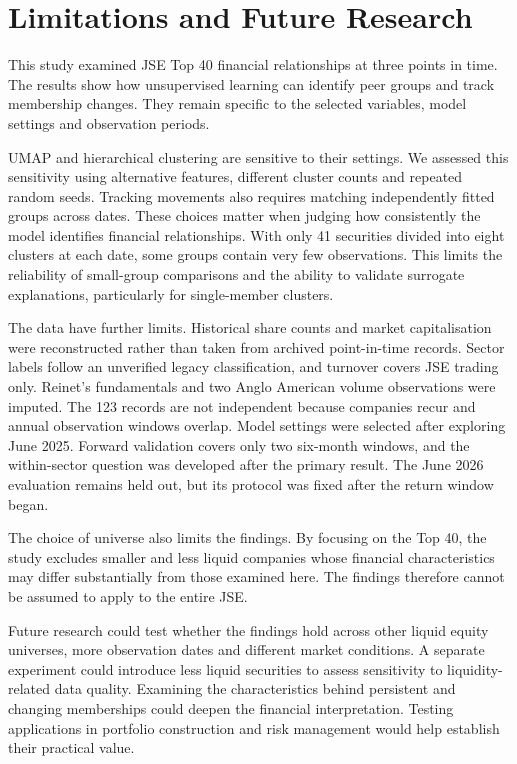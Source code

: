 \section{Limitations and Future Research}

This study examined JSE Top 40 financial relationships at three points in time. The results show how unsupervised learning can identify peer groups and track membership changes. They remain specific to the selected variables, model settings and observation periods.

UMAP and hierarchical clustering are sensitive to their settings. We assessed this sensitivity using alternative features, different cluster counts and repeated random seeds. Tracking movements also requires matching independently fitted groups across dates. These choices matter when judging how consistently the model identifies financial relationships. With only 41 securities divided into eight clusters at each date, some groups contain very few observations. This limits the reliability of small-group comparisons and the ability to validate surrogate explanations, particularly for single-member clusters.

The data have further limits. Historical share counts and market capitalisation were reconstructed rather than taken from archived point-in-time records. Sector labels follow an unverified legacy classification, and turnover covers JSE trading only. Reinet's fundamentals and two Anglo American volume observations were imputed. The 123 records are not independent because companies recur and annual observation windows overlap. Model settings were selected after exploring June 2025. Forward validation covers only two six-month windows, and the within-sector question was developed after the primary result. The June 2026 evaluation remains held out, but its protocol was fixed after the return window began.

The choice of universe also limits the findings. By focusing on the Top 40, the study excludes smaller and less liquid companies whose financial characteristics may differ substantially from those examined here. The findings therefore cannot be assumed to apply to the entire JSE.

Future research could test whether the findings hold across other liquid equity universes, more observation dates and different market conditions. A separate experiment could introduce less liquid securities to assess sensitivity to liquidity-related data quality. Examining the characteristics behind persistent and changing memberships could deepen the financial interpretation. Testing applications in portfolio construction and risk management would help establish their practical value.
